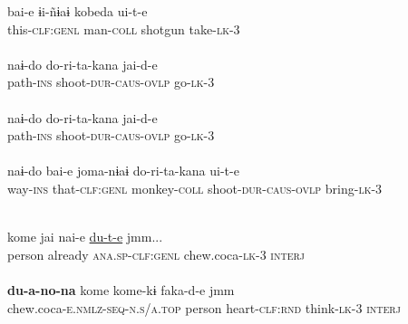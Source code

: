 \documentclass[output=paper]{LSP/langsci}
\begin{document}
\begin{exe}
\ex \label{GuAiex:42ad}
\begin{xlist}
\ex \label{GuAiex:42a}
\gll bai-e     ɨi-ñɨaɨ     kobeda   ui-t-e\\
this-\textsc{clf:genl}   man-\textsc{coll}   shotgun   take-\textsc{lk}-3 \\
\glt {} \\
\ex \label{GuAiex:42b}
\gll naɨ-do     do-ri-ta-kana       jai-d-e \\
path-\textsc{ins}   shoot-\textsc{dur-caus-ovlp}     go-\textsc{lk-}3 \\
\glt {} \\
\ex \label{GuAiex:42c}
\gll naɨ-do   do-ri-ta-kana       jai-d-e \\
path-\textsc{ins}   shoot-\textsc{dur-caus-ovlp}     go-\textsc{lk}-3\\
\glt {} \\
\ex \label{GuAiex:42d}
\gll naɨ-do     bai-e     joma-nɨaɨ       do-ri-ta-kana  ui-t-e\\
way-\textsc{ins}   that-\textsc{clf:genl}  monkey-\textsc{coll}   shoot-\textsc{dur-caus-ovlp}  bring-\textsc{lk}-3 \\
\glt {} 
\end{xlist}
\end{exe}

\begin{exe}
\ex \label{GuAiex:43ac}
\begin{xlist}
\ex \label{GuAiex:43a}
\glt {} \\ \vspace{-0.2in}
\ex \label{GuAiex:43b}
\gll kome     jai     nai-e     \underline{du-t-e}       jmm...\\
person     already   \textsc{ana.sp-clf:genl}   chew.coca-\textsc{lk}-3   \textsc{interj} \\
\glt {} \\
\ex \label{GuAiex:43c}
\gll \textbf{du-a-no-na} kome   kome-kɨ     faka-d-e   jmm\\
chew.coca-\textsc{e.nmlz-seq-n.s/a.top} person   heart-\textsc{clf:rnd}    think-\textsc{lk}-3   \textsc{interj} \\
\glt {} 
\end{xlist}
\end{exe}
\end{document}
